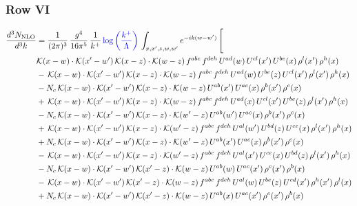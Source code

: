 \documentclass[9pt]{article}
\numberwithin{equation}{section}
\begin{document}
\subsubsection{Row VI}
\begin{align}
\frac{d^{3}N_{\mathrm{NLO}}}{d^{3}k} & = \frac{1}{(2\pi)^{3}}\,\frac{g^{4}}{16\pi^{5}}\,\frac{1}{k^{+}}\,{\color{blue}\log{\left(\frac{k^{+}}{\Lambda}\right)}}\,\int_{x,x',z,w,w'}e^{-ik(w-w')}\,\Bigg[\notag\\ & \mathcal{K}(x-w)\cdot\mathcal{K}(x'-w')\,\mathcal{K}(x-z)\cdot\mathcal{K}(w-z)\,f^{abc}\,f^{deh}\,U^{ad}(w)\,U^{cl}(x')\,U^{be}(x)\,\rho^{l}(x')\,\rho^{h}(x)\notag\\
& -\,\mathcal{K}(x-w)\cdot\mathcal{K}(x'-w')\,\mathcal{K}(x-z)\cdot\mathcal{K}(w-z)\,f^{abc}\,f^{deh}\,U^{ad}(w)\,U^{be}(z)\,U^{cl}(x')\,\rho^{l}(x')\,\rho^{h}(x)\notag\\
& -N_{c}\,\mathcal{K}(x-w)\cdot\mathcal{K}(x'-w')\,\mathcal{K}(x-z)\cdot\mathcal{K}(w-z)\,U^{ab}(x')\,U^{ac}(x)\,\rho^{b}(x')\,\rho^{c}(x)\notag\\
& +\,\mathcal{K}(x-w)\cdot\mathcal{K}(x'-w')\,\mathcal{K}(x-z)\cdot\mathcal{K}(w-z)\,f^{abc}\,f^{deh}\,U^{ad}(x)\,U^{cl}(x')\,U^{be}(z)\,\rho^{l}(x')\,\rho^{h}(x)\notag\\
& -N_{c}\,\mathcal{K}(x-w)\cdot\mathcal{K}(x'-w')\,\mathcal{K}(x-z)\cdot\mathcal{K}(w'-z)\,U^{ab}(w')\,U^{ac}(x)\,\rho^{b}(x')\,\rho^{c}(x)\notag\\
& +\,\mathcal{K}(x-w)\cdot\mathcal{K}(x'-w')\,\mathcal{K}(x-z)\cdot\mathcal{K}(w'-z)\,f^{abc}\,f^{deh}\,U^{al}(w')\,U^{bd}(z)\,U^{ce}(x)\,\rho^{l}(x')\,\rho^{h}(x)\notag\\
& +N_{c}\,\mathcal{K}(x-w)\cdot\mathcal{K}(x'-w')\,\mathcal{K}(x-z)\cdot\mathcal{K}(w'-z)\,U^{ab}(x')\,U^{ac}(x)\,\rho^{b}(x')\,\rho^{c}(x)\notag\\
& -\,\mathcal{K}(x-w)\cdot\mathcal{K}(x'-w')\,\mathcal{K}(x-z)\cdot\mathcal{K}(w'-z)\,f^{abc}\,f^{deh}\,U^{al}(x')\,U^{ce}(x)\,U^{bd}(z)\,\rho^{l}(x')\,\rho^{h}(x)\notag\\
& -N_{c}\,\mathcal{K}(x-w)\cdot\mathcal{K}(x'-w')\,\mathcal{K}(x'-z)\cdot\mathcal{K}(w-z)\,U^{ab}(w)\,U^{ac}(x')\,\rho^{c}(x')\,\rho^{b}(x)\notag\\
& -\,\mathcal{K}(x-w)\cdot\mathcal{K}(x'-w')\,\mathcal{K}(x'-z)\cdot\mathcal{K}(w-z)\,f^{abc}\,f^{deh}\,U^{al}(w)\,U^{be}(z)\,U^{cd}(x')\,\rho^{h}(x')\,\rho^{l}(x)\notag\\
& +N_{c}\,\mathcal{K}(x-w)\cdot\mathcal{K}(x'-w')\,\mathcal{K}(x'-z)\cdot\mathcal{K}(w-z)\,U^{ab}(x)\,U^{ac}(x')\,\rho^{c}(x')\,\rho^{b}(x)\notag\\

\end{align}
\end{document}
